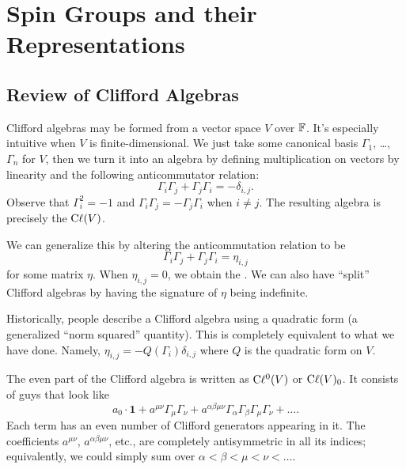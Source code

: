 \chapter{Spin Groups and their Representations}

\section{Review of Clifford Algebras}

\M
Clifford algebras may be formed from a vector space $V$ over $\mathbb{F}$. It's
especially intuitive when $V$ is finite-dimensional. We just take some
canonical basis $\Gamma_{1}$, \dots, $\Gamma_{n}$ for $V$, then we turn it into an
algebra by defining multiplication on vectors by linearity and the
following anticommutator relation:
\begin{equation}
\Gamma_{i}\Gamma_{j} + \Gamma_{j}\Gamma_{i} = -\delta_{i,j}.
\end{equation}
Observe that $\Gamma_{i}^{2}=-1$ and $\Gamma_{i}\Gamma_{j}=-\Gamma_{j}\Gamma_{i}$ when $i\neq j$.
The resulting algebra is precisely the  $\mathrm{C}\ell(V)$.

We can generalize this by altering the anticommutation relation to be
\begin{equation}
\Gamma_{i}\Gamma_{j} + \Gamma_{j}\Gamma_{i} = \eta_{i,j}
\end{equation}
for some matrix $\eta$. When $\eta_{i,j}=0$, we obtain the
. We can also have ``split'' Clifford algebras
by having the signature of $\eta$ being indefinite.

\begin{remark}
Historically, people describe a Clifford algebra using a quadratic form
(a generalized ``norm squared'' quantity). This is completely equivalent
to what we have done. Namely, $\eta_{i,j}=-Q(\Gamma_{i})\delta_{i,j}$ where
$Q$ is the quadratic form on $V$.
\end{remark}

The even part of the Clifford algebra is written as $\mathrm{C}\ell^{0}(V)$ or
$\mathrm{C}\ell(V)_{0}$. It consists of guys that look like
\[ a_{0}\cdot\mathbf{1} + a^{\mu\nu}\Gamma_{\mu}\Gamma_{\nu} + a^{\alpha\beta\mu\nu}\Gamma_{\alpha}\Gamma_{\beta}\Gamma_{\mu}\Gamma_{\nu}+\dots.\]
Each term has an even number of Clifford generators appearing in it. The
coefficients $a^{\mu\nu}$, $a^{\alpha\beta\mu\nu}$, etc., are completely
antisymmetric in all its indices; equivalently, we could simply sum over
$\alpha<\beta<\mu<\nu<\dots$. 

